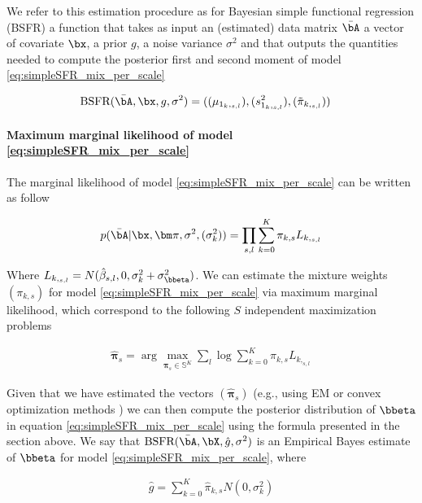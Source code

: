  We refer to this estimation procedure as  for Bayesian simple functional regression (BSFR) a function that takes as input an (estimated) data matrix $\Bar{\bA}$  a vector of covariate $\bx$, a prior $g$, a noise variance $\sigma^2$ and that outputs the quantities needed to compute the posterior first and second moment of model \ref{eq:simpleSFR_mix_per_scale}

\begin{align}
    \text{BSFR}(\Bar{\bA},\bx,g,\sigma^2)& = ((\mu_{1_k,_{s,l}}),(s^2_{1_k,_{s,l}}),( \Tilde{\pi}_{k, _{s,l}}) )\label{eq:BSFR} 
\end{align} 



\paragraph{Maximum marginal likelihood of model \ref{eq:simpleSFR_mix_per_scale}}




The marginal likelihood of model \ref{eq:simpleSFR_mix_per_scale} can be written as follow

 
\begin{align}
     p(\bar{\bA}|\bx, \bm\pi, \sigma^2 ,(\sigma^2_k)  ) =  \prod_{s,l} \sum_{k=0}^K  \pi_{k,s}L_{k,_{s,l}}
 \end{align}

Where $L_{k,_{s,l}}= N(\hat{\beta} _{s,l},0,\sigma_k^2+\sigma_{ \bbeta}^2)$. We can estimate the mixture weights $(\pi_{k,s})$  for model \ref{eq:simpleSFR_mix_per_scale} via   maximum marginal  likelihood, which correspond to  the following $S$ independent maximization problems

\begin{align}
    \hat{\bm{\pi}}_s = \arg\max _{\bm{\pi}_s \in \mathbb{S}^K}  \sum_{l} \log  \sum_{k=0}^K  \pi_{k,s}L_{k,_{s,l}}
\end{align}


 Given that we have estimated the vectors $(\hat{\bm{\pi}}_s)$ (e.g., using EM \cite{dempster_maximum_1977} or convex optimization methods \cite{kim_fast_2019}) we can then compute the posterior distribution of  $\bbeta$ in equation \ref{eq:simpleSFR_mix_per_scale} using the formula presented in the section above. We say that  $ \text{BSFR}(\Bar{\bA},\bX,\hat{g},  \sigma ^2) $ is an Empirical Bayes estimate of  $\bbeta$ for model  \ref{eq:simpleSFR_mix_per_scale}, where

\begin{align}
    \hat{g}  =\sum_{k=0}^K  \hat{\pi}_{k ,s} N(0,\sigma_{k }^2)
\end{align}




